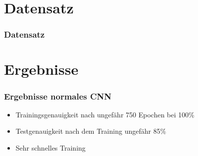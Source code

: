 \documentclass{beamer}
\begin{document}
\section{Datensatz}

\begin{frame}
	\frametitle{Datensatz}
\end{frame}

\section{Ergebnisse}

\begin{frame}
	\frametitle{Ergebnisse normales CNN}
	\begin{figure}
	\end{figure}
	\begin{itemize}
		\item Trainingsgenauigkeit nach ungefähr 750 Epochen bei 100\%
		\item Testgenauigkeit nach dem Training ungefähr 85\%
		\item Sehr schnelles Training
	\end{itemize}
\end{frame}
\end{document}
